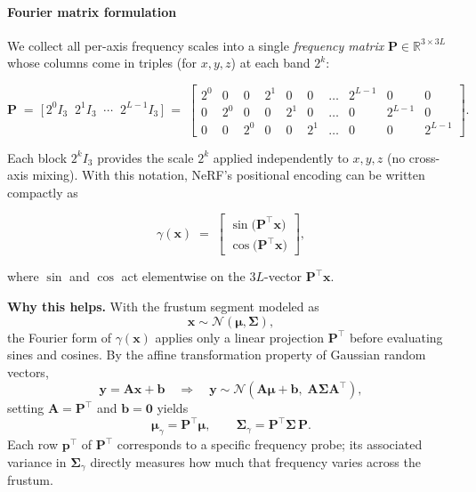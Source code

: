 \begin{enrichment}
\begin{enrichment}
    \paragraph{Fourier matrix formulation}
    We collect all per-axis frequency scales into a single \emph{frequency matrix} $\mathbf{P} \in \mathbb{R}^{3\times 3L}$ whose columns come in triples (for $x,y,z$) at each band $2^k$:
    
    $$
    \mathbf{P}
    \;=\;
    \big[\,2^0 I_3 \;\; 2^1 I_3 \;\; \cdots \;\; 2^{L-1} I_3\,\big]
    \;=\;
    \begin{bmatrix}
        2^0 & 0   & 0   & 2^1 & 0   & 0   & \dots & 2^{L-1} & 0         & 0         \\
        0   & 2^0 & 0   & 0   & 2^1 & 0   & \dots & 0        & 2^{L-1}  & 0         \\
        0   & 0   & 2^0 & 0   & 0   & 2^1 & \dots & 0        & 0         & 2^{L-1}
    \end{bmatrix}.
    $$
    
    Each block $2^k I_3$ provides the scale $2^k$ applied independently to $x,y,z$ (no cross-axis mixing). With this notation, NeRF’s positional encoding can be written compactly as
    
    $$
    \gamma(\mathbf{x})
    \;=\;
    \begin{bmatrix}
        \sin\!\big(\mathbf{P}^\top \mathbf{x}\big)\\[2pt]
        \cos\!\big(\mathbf{P}^\top \mathbf{x}\big)
    \end{bmatrix},
    $$
    
    where $\sin$ and $\cos$ act elementwise on the $3L$-vector $\mathbf{P}^\top \mathbf{x}$.
    
    \newpage 
    
    \noindent
    \textbf{Why this helps.}  
    With the frustum segment modeled as
    \[
    \mathbf{x} \sim \mathcal{N}(\boldsymbol{\mu}, \boldsymbol{\Sigma}),
    \]
    the Fourier form of $\gamma(\mathbf{x})$ applies only a linear projection $\mathbf{P}^\top$ before evaluating sines and cosines.  
    By the affine transformation property of Gaussian random vectors,
    \[
    \mathbf{y} = \mathbf{A}\mathbf{x} + \mathbf{b} 
    \quad\Rightarrow\quad
    \mathbf{y} \sim \mathcal{N}(\mathbf{A}\boldsymbol{\mu} + \mathbf{b},\; \mathbf{A}\boldsymbol{\Sigma}\mathbf{A}^\top),
    \]
    setting $\mathbf{A} = \mathbf{P}^\top$ and $\mathbf{b} = \mathbf{0}$ yields
    \[
    \boldsymbol{\mu}_\gamma = \mathbf{P}^\top \boldsymbol{\mu},
    \qquad
    \boldsymbol{\Sigma}_\gamma = \mathbf{P}^\top \boldsymbol{\Sigma}\,\mathbf{P}.
    \]
    Each row $\mathbf{p}^\top$ of $\mathbf{P}^\top$ corresponds to a specific frequency probe; its associated variance in $\boldsymbol{\Sigma}_\gamma$ directly measures how much that frequency varies across the frustum.
    

\end{enrichment}
\end{enrichment}
